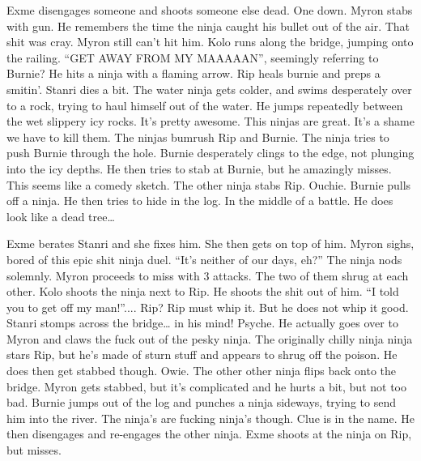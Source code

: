 Exme disengages someone and shoots someone else dead. One down. Myron stabs with gun. He remembers the time the ninja caught his bullet out of the air. That shit was cray. Myron still can’t hit him. Kolo runs along the bridge, jumping onto the railing. “GET AWAY FROM MY MAAAAAN”, seemingly referring to Burnie? He hits a ninja with a flaming arrow. Rip heals burnie and preps a smitin’. Stanri dies a bit. The water ninja gets colder, and swims desperately over to a rock, trying to haul himself out of the water. He jumps repeatedly between the wet slippery icy rocks. It’s pretty awesome. This ninjas are great. It’s a shame we have to kill them. The ninjas bumrush Rip and Burnie. The ninja tries to push Burnie through the hole. Burnie desperately clings to the edge, not plunging into the icy depths. He then tries to stab at Burnie, but he amazingly misses. This seems like a comedy sketch. The other ninja stabs Rip. Ouchie. Burnie pulls off a ninja. He then tries to hide in the log. In the middle of a battle. He does look like a dead tree…\medskip

Exme berates Stanri and she fixes him. She then gets on top of him. Myron sighs, bored of this epic shit ninja duel. “It’s neither of our days, eh?” The ninja nods solemnly. Myron proceeds to miss with 3 attacks. The two of them shrug at each other. Kolo shoots the ninja next to Rip. He shoots the shit out of him. “I told you to get off my man!”.... Rip? Rip must whip it. But he does not whip it good. Stanri stomps across the bridge… in his mind! Psyche. He actually goes over to Myron and claws the fuck out of the pesky ninja. The originally chilly ninja ninja stars Rip, but he’s made of sturn stuff and appears to shrug off the poison. He does then get stabbed though. Owie. The other other ninja flips back onto the bridge. Myron gets stabbed, but it’s complicated and he hurts a bit, but not too bad. Burnie jumps out of the log and punches a ninja sideways, trying to send him into the river. The ninja’s are fucking ninja’s though. Clue is in the name. He then disengages and re-engages the other ninja. Exme shoots at the ninja on Rip, but misses.\medskip


